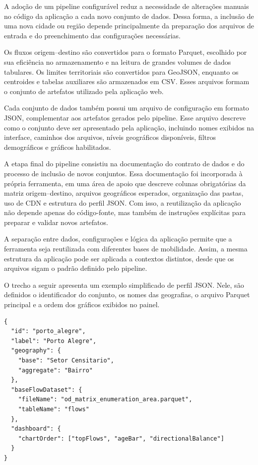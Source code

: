 \documentclass[12pt]{article}
\begin{document}
A adoção de um pipeline configurável reduz a necessidade de alterações manuais no código da aplicação a cada novo conjunto de dados. Dessa forma, a inclusão de uma nova cidade ou região depende principalmente da preparação dos arquivos de entrada e do preenchimento das configurações necessárias.

Os fluxos origem--destino são convertidos para o formato Parquet, escolhido por sua eficiência no armazenamento e na leitura de grandes volumes de dados tabulares. Os limites territoriais são convertidos para GeoJSON, enquanto os centroides e tabelas auxiliares são armazenados em CSV. Esses arquivos formam o conjunto de artefatos utilizado pela aplicação web.

Cada conjunto de dados também possui um arquivo de configuração em formato JSON, complementar aos artefatos gerados pelo pipeline. Esse arquivo descreve como o conjunto deve ser apresentado pela aplicação, incluindo nomes exibidos na interface, caminhos dos arquivos, níveis geográficos disponíveis, filtros demográficos e gráficos habilitados.

A etapa final do pipeline consistiu na documentação do contrato de dados e do processo de inclusão de novos conjuntos. Essa documentação foi incorporada à própria ferramenta, em uma área de apoio que descreve colunas obrigatórias da matriz origem--destino, arquivos geográficos esperados, organização das pastas, uso de CDN e estrutura do perfil JSON. Com isso, a reutilização da aplicação não depende apenas do código-fonte, mas também de instruções explícitas para preparar e validar novos artefatos.

A separação entre dados, configurações e lógica da aplicação permite que a ferramenta seja reutilizada com diferentes bases de mobilidade. Assim, a mesma estrutura da aplicação pode ser aplicada a contextos distintos, desde que os arquivos sigam o padrão definido pelo pipeline.

O trecho a seguir apresenta um exemplo simplificado de perfil JSON. Nele, são definidos o identificador do conjunto, os nomes das geografias, o arquivo Parquet principal e a ordem dos gráficos exibidos no painel.

\begingroup
\footnotesize
\begin{verbatim}
{
  "id": "porto_alegre",
  "label": "Porto Alegre",
  "geography": {
    "base": "Setor Censitario",
    "aggregate": "Bairro"
  },
  "baseFlowDataset": {
    "fileName": "od_matrix_enumeration_area.parquet",
    "tableName": "flows"
  },
  "dashboard": {
    "chartOrder": ["topFlows", "ageBar", "directionalBalance"]
  }
}
\end{verbatim}
\endgroup
\end{document}

